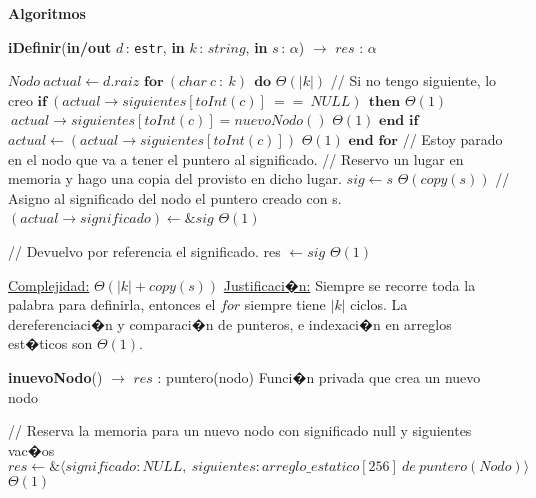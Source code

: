 \documentclass[a4paper,10pt]{article}
\let\TipoVariable=\texttt
\let\ModificadorArgumento=\textbf
\newcommand{\tab}{\hspace*{7mm}}
\newcommand{\ttab}{\tab \tab}
\newcommand{\In}[2]{\ModificadorArgumento{in} \ensuremath{#1}\,: \TipoVariable{#2}\xspace}
\newcommand{\Inout}[2]{\ModificadorArgumento{in/out} \ensuremath{#1}\,: \TipoVariable{#2}\xspace}
\newenvironment{Algoritmos}{%
  \vspace*{2ex}%
  \noindent\textbf{\Large Algoritmos}%
  \vspace*{2ex}%
}{}
\newcommand{\DRef}{\ensuremath{\rightarrow}}
\newcommand{\tuple}[1]{\langle #1 \rangle}
\begin{document}
{\begin{Algoritmos}
    \begin{algorithm}[H]{\textbf{iDefinir}(\Inout{d}{estr}, \In{k}{$string$}, \In{s}{$\alpha$}) $\to$ $res$ : $\alpha$}
      \begin{algorithmic}[1]
          \State $Nodo \ actual \gets d.raiz$
          \State $\textbf{for} \ (char \ c \ : \ k) \ \ \textbf{do}$                                          \Comment $\Theta(|k|)$  
          \State \tab   // Si no tengo siguiente, lo creo
          \State \tab   $\textbf{if} \ (actual \DRef siguientes [toInt(c)] \ == \ NULL) \ \ \textbf{then}$    \Comment $\Theta(1)$
          \State \ttab  $\ actual \DRef siguientes[toInt(c)] = nuevoNodo()$                                   \Comment $\Theta(1)$
          \State \tab   $\textbf{end if}$
          \State \tab   $actual \gets (actual \DRef siguientes [toInt(c)])$                                   \Comment $\Theta(1)$
          \State $\textbf{end for}$  
          \State
          \State // Estoy parado en el nodo que va a tener el puntero al significado.
          \State // Reservo un lugar en memoria y hago una copia del provisto en dicho lugar.
          \State $sig \gets s$                                                                                \Comment $\Theta(copy(s))$
          \State // Asigno al significado del nodo el puntero creado con s.
          \State $(actual \DRef significado) \gets \&sig$                                                       \Comment $\Theta(1)$
          
          \State // Devuelvo por referencia el significado.
          \State res $\gets sig$                                                                              \Comment $\Theta(1)$

          \medskip
          \Statex \underline{Complejidad:} $\Theta(|k| + copy(s))$
          \Statex \underline{Justificaci�n:} Siempre se recorre toda la palabra para definirla, entonces el $for$ siempre tiene $|k|$ ciclos. La dereferenciaci�n y comparaci�n de punteros, e indexaci�n en arreglos est�ticos son $\Theta(1)$.
          \end{algorithmic}
    \end{algorithm}
  
    \begin{algorithm}[H]{\textbf{inuevoNodo}() $\to$ $res$ : puntero(nodo)} \Comment Funci�n privada que crea un nuevo nodo
      \begin{algorithmic}[1]
           \State // Reserva la memoria para un nuevo nodo con significado null y siguientes vac�os
           \State $res \gets \& \tuple{significado: NULL, \ siguientes: arreglo\_estatico[256] \ de\ puntero(Nodo)}$ 				\Comment $\Theta(1)$
    

\end{algorithmic}
\end{algorithm}
\end{Algoritmos}}
\end{document}
